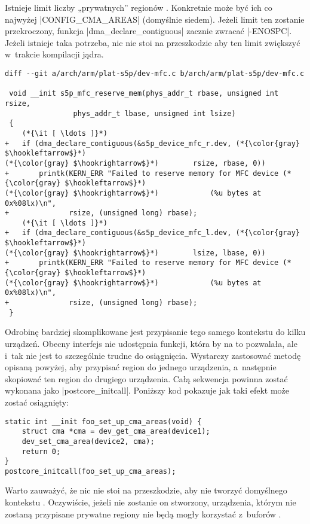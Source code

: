 Istnieje limit liczby „prywatnych” regionów .  Konkretnie może być
ich co najwyżej \code|CONFIG_CMA_AREAS| (domyślnie siedem).  Jeżeli
limit ten zostanie przekroczony, funkcja \code|dma_declare_contiguous|
zacznie zwracać \code|-ENOSPC|.  Jeżeli istnieje taka potrzeba, nic
nie stoi na przeszkodzie aby ten limit zwiększyć w~trakcie kompilacji
jądra.

\begin{lstlisting}[float=tbhp,caption={Przypisanie prywatnych regionów
      \acc{CMA} do dwóch urządzeń.},label=lst:s5p-priv-region]
diff --git a/arch/arm/plat-s5p/dev-mfc.c b/arch/arm/plat-s5p/dev-mfc.c

 void __init s5p_mfc_reserve_mem(phys_addr_t rbase, unsigned int rsize,
 				phys_addr_t lbase, unsigned int lsize)
 {
	(*{\it [ \ldots ]}*)
+	if (dma_declare_contiguous(&s5p_device_mfc_r.dev, (*{\color{gray} $\hookleftarrow$}*)
(*{\color{gray} $\hookrightarrow$}*)		rsize, rbase, 0))
+		printk(KERN_ERR "Failed to reserve memory for MFC device (*{\color{gray} $\hookleftarrow$}*)
(*{\color{gray} $\hookrightarrow$}*)			(%u bytes at 0x%08lx)\n",
+		       rsize, (unsigned long) rbase);
	(*{\it [ \ldots ]}*)
+	if (dma_declare_contiguous(&s5p_device_mfc_l.dev, (*{\color{gray} $\hookleftarrow$}*)
(*{\color{gray} $\hookrightarrow$}*)		lsize, lbase, 0))
+		printk(KERN_ERR "Failed to reserve memory for MFC device (*{\color{gray} $\hookleftarrow$}*)
(*{\color{gray} $\hookrightarrow$}*)			(%u bytes at 0x%08lx)\n",
+		       rsize, (unsigned long) rbase);
 }
\end{lstlisting}

Odrobinę bardziej skomplikowane jest przypisanie tego samego kontekstu
do kilku urządzeń.  Obecny interfejs  nie udostępnia funkcji, która
by na to pozwalała, ale i~tak nie jest to szczególnie trudne do
osiągnięcia.  Wystarczy zastosować metodę opisaną powyżej, aby
przypisać region do jednego urządzenia, a~następnie skopiować ten
region do drugiego urządzenia.  Całą sekwencja powinna zostać wykonana
jako \code|postcore_initcall|.  Poniższy kod pokazuje jak taki efekt
może zostać osiągnięty:

\begin{lstlisting}
static int __init foo_set_up_cma_areas(void) {
	struct cma *cma = dev_get_cma_area(device1);
	dev_set_cma_area(device2, cma);
	return 0;
}
postcore_initcall(foo_set_up_cma_areas);
\end{lstlisting}

Warto zauważyć, że nic nie stoi na przeszkodzie, aby nie tworzyć
domyślnego kontekstu .  Oczywiście, jeżeli nie zostanie on
stworzony, urządzenia, którym nie zostaną przypisane prywatne regiony
nie będą mogły korzystać z~buforów .
